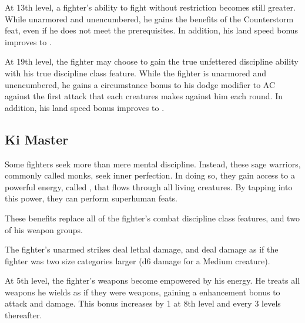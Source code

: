  At 13th level, a fighter's ability to fight without restriction becomes still greater. While unarmored and unencumbered, he gains the benefits of the Counterstorm feat, even if he does not meet the prerequisites. In addition, his land speed bonus improves to .

 At 19th level, the fighter may choose to gain the true unfettered discipline ability with his true discipline class feature. While the fighter is unarmored and unencumbered, he gains a  circumstance bonus to his dodge modifier to AC against the first attack that each creatures makes against him each round. In addition, his land speed bonus improves to .

\subsection{Ki Master} 
Some fighters seek more than mere mental discipline. Instead, these sage warriors, commonly called monks, seek inner perfection. In doing so, they gain access to a powerful energy, called \ki, that flows through all living creatures. By tapping into this power, they can perform superhuman feats.

These benefits replace all of the fighter's combat discipline class features, and two of his weapon groups.

 The fighter's unarmed strikes deal lethal damage, and deal damage as if the fighter was two size categories larger (d6 damage for a Medium creature). 

 At 5th level, the fighter's weapons become empowered by his \ki energy. He treats all weapons he wields as if they were  weapons, gaining a  enhancement bonus to attack and damage. This bonus increases by 1 at 8th level and every 3 levels thereafter.
